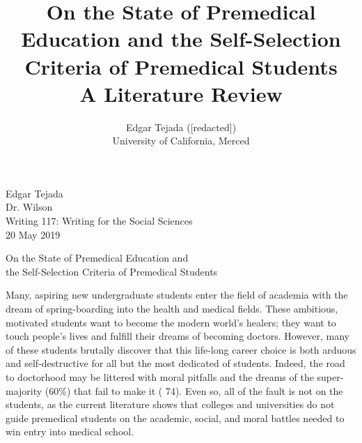 \documentclass [12pt]{article}
\title{On the State of Premedical Education and the Self-Selection Criteria of Premedical Students \\\medskip A Literature Review}
\author{Edgar Tejada ([redacted])\\University of California, Merced}
\begin{document}
\begin{flushleft}
Edgar Tejada\\
Dr. Wilson\\
Writing 117: Writing for the Social Sciences\\
20 May 2019\\


\begin{center}
	On the State of Premedical Education and \\the Self-Selection Criteria of Premedical Students
\end{center}


\setlength{\parindent}{0.5in}
Many, aspiring new undergraduate students enter the field of academia with the dream of spring-boarding into the health and medical fields. These ambitious, motivated students want to become the modern world's healers; they want to touch people's lives and fulfill their dreams of becoming doctors. However, many of these students brutally discover that this life-long career choice is both arduous and self-destructive for all but the most dedicated of students. Indeed, the road to doctorhood may be littered with moral pitfalls and the dreams of the super-majority (60\%) that fail to make it (\cite{Olsen-2016} 74). Even so, all of the fault is not on the students, as the current literature shows that colleges and universities do not guide premedical students on the academic, social, and moral battles needed to win entry into medical school.


\end{flushleft}
\end{document}

